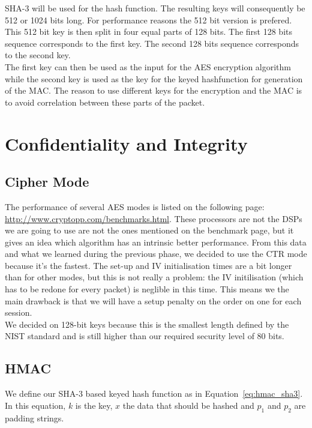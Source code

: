 \documentclass[a4paper]{article}
\begin{document}
SHA-3 will be used for the hash function. The resulting keys will consequently be 512 or 1024 bits long. For performance reasons the 512 bit version is prefered. This 512 bit key is then split in four equal parts of 128 bits. The first 128 bits sequence corresponds to the first key. The second 128 bits sequence corresponds to the second key.\\

The first key can then be used as the input for the AES encryption algorithm while the second key is used as the key for the keyed hashfunction for generation of the MAC. The reason to use different keys for the encryption and the MAC is to avoid correlation between these parts of the packet.

\section{Confidentiality and Integrity}

\subsection{Cipher Mode}

The performance of several AES modes is listed on the following page: \url{http://www.cryptopp.com/benchmarks.html}. These processors are not the DSPs we are going to use are not the ones mentioned on the benchmark page, but it gives an idea which algorithm has an intrinsic better performance. From this data and what we learned during the previous phase, we decided to use the CTR mode because it's the fastest. The set-up and IV initialisation times are a bit longer than for other modes, but this is not really a problem: the IV initilisation (which has to be redone for every packet) is neglible in this time. This means we the main drawback is that we will have a setup penalty on the order on one {\micro\second} for each session.\\

We decided on 128-bit keys because this is the smallest length defined by the NIST standard and is still higher than our required security level of 80 bits.

\subsection{HMAC}

We define our SHA-3 based keyed hash function as in Equation~\ref{eq:hmac_sha3}. In this equation, $k$ is the key, $x$ the data that should be hashed and $p_1$ and $p_2$ are padding strings.
\end{document}
